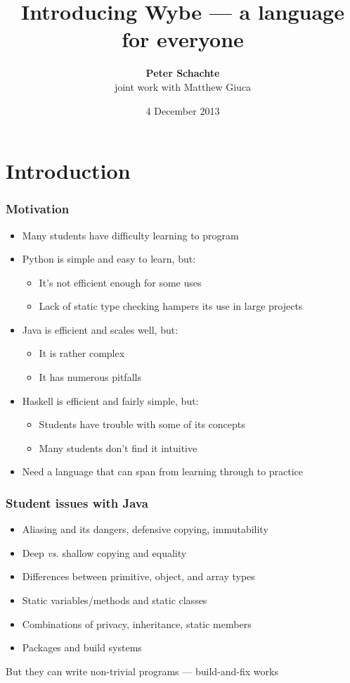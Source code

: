 \documentclass[12pt]{beamer}
\title[Introducing Wybe]{Introducing Wybe --- a language for everyone}
\author[Peter Schachte]
{\textbf{Peter Schachte}  \\
  \small joint work with Matthew Giuca}
\institute[Melbourne]{The University of Melbourne \\ Department of
  Computing and Information Systems}
\date{4 December 2013}
\begin{document}
\frame{\titlepage}

\section{Introduction}

\begin{frame}
\frametitle{Motivation}
\begin{itemize}
\item Many students have difficulty learning to program
\item Python is simple and easy to learn, but:
  \begin{itemize}
  \item It's not efficient enough for some uses
  \item Lack of static type checking hampers its use in large projects
  \end{itemize}
\item Java is efficient and scales well, but:
  \begin{itemize}
  \item It is rather complex
  \item It has numerous pitfalls
  \end{itemize}
\item Haskell is efficient and fairly simple, but:
  \begin{itemize}
  \item Students have trouble with some of its concepts
  \item Many students don't find it intuitive
  \end{itemize}
\item Need a language that can span from learning through to practice
\end{itemize}
\end{frame}

\begin{frame}
\frametitle{Student issues with Java}
\begin{itemize}
\item Aliasing and its dangers, defensive copying, immutability
\item Deep \emph{vs.} shallow copying and equality
\item Differences between primitive, object, and array types
\item Static variables/methods and static classes
\item Combinations of privacy, inheritance, static members
\item Packages and build systems
\end{itemize}

But they can write non-trivial programs --- build-and-fix works

\end{frame}
\end{document}

